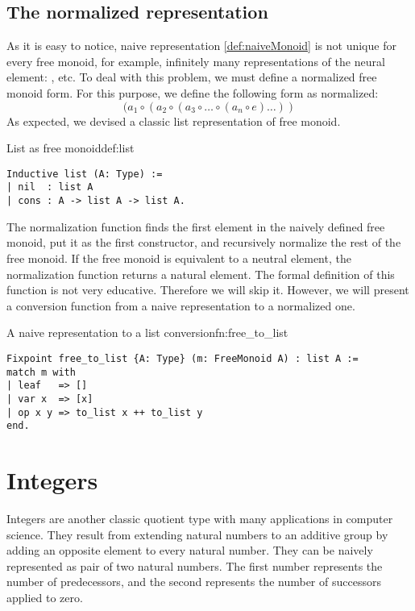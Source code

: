 \subsection{The normalized representation}
As it is easy to notice, naive representation \ref{def:naiveMonoid} is not unique for every free monoid, for example, infinitely many representations of the neural element: ,  etc. To deal with this problem, we must define a normalized free monoid form. For this purpose, we define the following form as normalized:
$$
    (a_1 \circ (a_2 \circ (a_3 \circ \dots  \circ (a_n \circ e) \dots ))
$$
As expected, we devised a classic list representation of free monoid. 
\begin{defi}{List as free monoid}{def:list}
\begin{verbatim}
Inductive list (A: Type) :=
| nil  : list A
| cons : A -> list A -> list A.
\end{verbatim}
\end{defi}
The normalization function finds the first element in the naively defined free monoid, put it as the first constructor, and recursively normalize the rest of the free monoid. If the free monoid is equivalent to a neutral element, the normalization function returns a natural element. The formal definition of this function is not very educative. Therefore we will skip it. However, we will present a conversion function from a naive representation to a normalized one.
\begin{func}{A naive representation to a list conversion}{fn:free_to_list}
\begin{verbatim}
Fixpoint free_to_list {A: Type} (m: FreeMonoid A) : list A :=
match m with
| leaf   => []
| var x  => [x]
| op x y => to_list x ++ to_list y
end.
\end{verbatim}
\end{func}
\section{Integers}
Integers are another classic quotient type with many applications in computer science. They result from extending natural numbers to an additive group by adding an opposite element to every natural number. They can be naively represented as pair of two natural numbers. The first number represents the number of predecessors, and the second represents the number of successors applied to zero.

